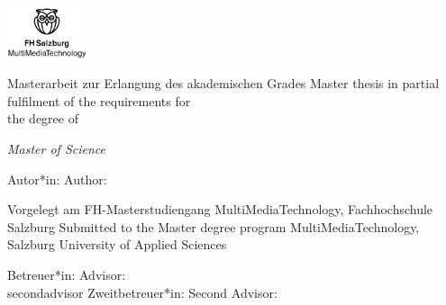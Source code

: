 \begin{titlepage}

\newcommand{\printsecondadvisor}[1]{%
  \ifcsname#1\endcsname%
  \ifmmtlanguagegerman Zweitbetreuer*in: \else Second Advisor: \fi \secondadvisor 
  \else%
    
  \fi%
}

\ifmmtmasterthesis

    
    
    \newpage
    
    \thispagestyle{empty}
    
    \hfill \includegraphics[height=1.5cm]{images/FHSLogo.jpg}
    
    \vspace*{2cm}
    
    \Large{
    \titlename
    
    \vspace*{1cm}
    
    \ifmmtlanguagegerman
    Masterarbeit zur Erlangung des akademischen Grades
    \else
    Master thesis in partial fulfilment of the requirements for\\ the degree of 
    \fi
    
    \vspace*{0.5cm}
    
    \textit{Master of Science}
    }
    
    
    \vspace*{1.5cm}
    {\large
    \ifmmtlanguagegerman Autor*in: \else Author: \fi \authorname
    }
    \vfill
    
    {\normalsize
    \ifmmtlanguagegerman
    Vorgelegt am FH-Masterstudiengang MultiMediaTechnology, Fachhochschule Salzburg
    \else
    Submitted to the Master degree program MultiMediaTechnology, Salzburg University of Applied Sciences
    \fi
    
    
    \vspace*{1cm}
    
    \ifmmtlanguagegerman Betreuer*in: \else Advisor: \fi
    \advisor
    \\    
    \printsecondadvisor{secondadvisor}
    
}
\end{titlepage}
